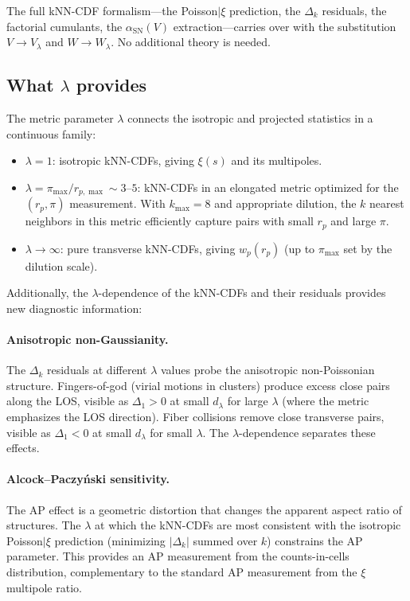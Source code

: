 The full kNN-CDF formalism---the Poisson$|\xi$ prediction, the $\Delta_k$ residuals, the factorial cumulants, the $\alpha_{\mathrm{SN}}(V)$ extraction---carries over with the substitution $V \to V_\lambda$ and $W \to W_\lambda$.  No additional theory is needed.

\subsection{What $\lambda$ provides}
\label{sec:lambda_provides}

The metric parameter $\lambda$ connects the isotropic and projected statistics in a continuous family:
\begin{itemize}[nosep]
  \item $\lambda = 1$: isotropic kNN-CDFs, giving $\xi(s)$ and its multipoles.
  \item $\lambda = \pi_{\max}/r_{p,\max} \sim 3$--$5$: kNN-CDFs in an elongated metric optimized for the $(r_p, \pi)$ measurement.  With $k_{\max} = 8$ and appropriate dilution, the $k$ nearest neighbors in this metric efficiently capture pairs with small $r_p$ and large $\pi$.
  \item $\lambda \to \infty$: pure transverse kNN-CDFs, giving $w_p(r_p)$ (up to $\pi_{\max}$ set by the dilution scale).
\end{itemize}

Additionally, the $\lambda$-dependence of the kNN-CDFs and their residuals provides new diagnostic information:

\paragraph{Anisotropic non-Gaussianity.}  The $\Delta_k$ residuals at different $\lambda$ values probe the anisotropic non-Poissonian structure.  Fingers-of-god (virial motions in clusters) produce excess close pairs along the LOS, visible as $\Delta_1 > 0$ at small $d_\lambda$ for large $\lambda$ (where the metric emphasizes the LOS direction).  Fiber collisions remove close transverse pairs, visible as $\Delta_1 < 0$ at small $d_\lambda$ for small $\lambda$.  The $\lambda$-dependence separates these effects.

\paragraph{Alcock--Paczy\'nski sensitivity.}  The AP effect is a geometric distortion that changes the apparent aspect ratio of structures.  The $\lambda$ at which the kNN-CDFs are most consistent with the isotropic Poisson$|\xi$ prediction (minimizing $|\Delta_k|$ summed over $k$) constrains the AP parameter.  This provides an AP measurement from the counts-in-cells distribution, complementary to the standard AP measurement from the $\xi$ multipole ratio.

